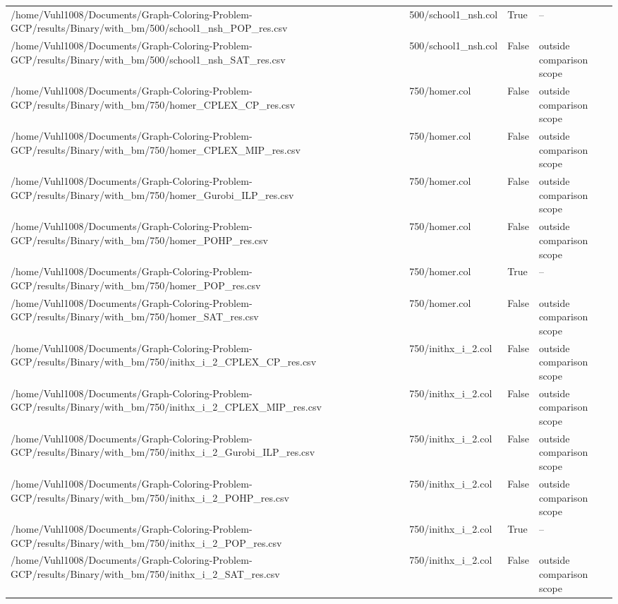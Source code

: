 \begin{table}[htbp]
\begin{tabular}{llll}
/home/Vuhl1008/Documents/Graph-Coloring-Problem-GCP/results/Binary/with\_bm/500/school1\_nsh\_POP\_res.csv & 500/school1\_nsh.col & True & -- \\
/home/Vuhl1008/Documents/Graph-Coloring-Problem-GCP/results/Binary/with\_bm/500/school1\_nsh\_SAT\_res.csv & 500/school1\_nsh.col & False & outside comparison scope \\
/home/Vuhl1008/Documents/Graph-Coloring-Problem-GCP/results/Binary/with\_bm/750/homer\_CPLEX\_CP\_res.csv & 750/homer.col & False & outside comparison scope \\
/home/Vuhl1008/Documents/Graph-Coloring-Problem-GCP/results/Binary/with\_bm/750/homer\_CPLEX\_MIP\_res.csv & 750/homer.col & False & outside comparison scope \\
/home/Vuhl1008/Documents/Graph-Coloring-Problem-GCP/results/Binary/with\_bm/750/homer\_Gurobi\_ILP\_res.csv & 750/homer.col & False & outside comparison scope \\
/home/Vuhl1008/Documents/Graph-Coloring-Problem-GCP/results/Binary/with\_bm/750/homer\_POHP\_res.csv & 750/homer.col & False & outside comparison scope \\
/home/Vuhl1008/Documents/Graph-Coloring-Problem-GCP/results/Binary/with\_bm/750/homer\_POP\_res.csv & 750/homer.col & True & -- \\
/home/Vuhl1008/Documents/Graph-Coloring-Problem-GCP/results/Binary/with\_bm/750/homer\_SAT\_res.csv & 750/homer.col & False & outside comparison scope \\
/home/Vuhl1008/Documents/Graph-Coloring-Problem-GCP/results/Binary/with\_bm/750/inithx\_i\_2\_CPLEX\_CP\_res.csv & 750/inithx\_i\_2.col & False & outside comparison scope \\
/home/Vuhl1008/Documents/Graph-Coloring-Problem-GCP/results/Binary/with\_bm/750/inithx\_i\_2\_CPLEX\_MIP\_res.csv & 750/inithx\_i\_2.col & False & outside comparison scope \\
/home/Vuhl1008/Documents/Graph-Coloring-Problem-GCP/results/Binary/with\_bm/750/inithx\_i\_2\_Gurobi\_ILP\_res.csv & 750/inithx\_i\_2.col & False & outside comparison scope \\
/home/Vuhl1008/Documents/Graph-Coloring-Problem-GCP/results/Binary/with\_bm/750/inithx\_i\_2\_POHP\_res.csv & 750/inithx\_i\_2.col & False & outside comparison scope \\
/home/Vuhl1008/Documents/Graph-Coloring-Problem-GCP/results/Binary/with\_bm/750/inithx\_i\_2\_POP\_res.csv & 750/inithx\_i\_2.col & True & -- \\
/home/Vuhl1008/Documents/Graph-Coloring-Problem-GCP/results/Binary/with\_bm/750/inithx\_i\_2\_SAT\_res.csv & 750/inithx\_i\_2.col & False & outside comparison scope \\

\end{tabular}
\end{table}

